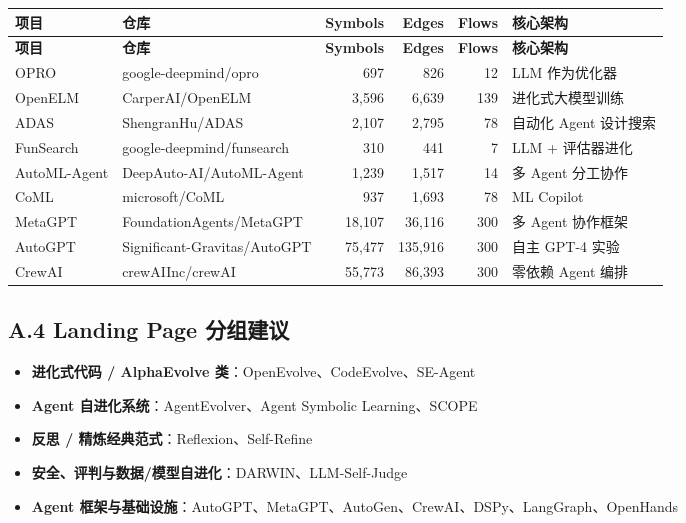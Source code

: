 \begin{longtable}{p{2.2cm}p{3.5cm}rrrp{2cm}}
\toprule
\textbf{项目} & \textbf{仓库} & \textbf{Symbols} & \textbf{Edges} & \textbf{Flows} & \textbf{核心架构} \\
\midrule
\endfirsthead
\toprule
\textbf{项目} & \textbf{仓库} & \textbf{Symbols} & \textbf{Edges} & \textbf{Flows} & \textbf{核心架构} \\
\midrule
\endhead
\bottomrule
\endlastfoot

OPRO & google-deepmind/opro & 697 & 826 & 12 & LLM 作为优化器 \\
OpenELM & CarperAI/OpenELM & 3,596 & 6,639 & 139 & 进化式大模型训练 \\
ADAS & ShengranHu/ADAS & 2,107 & 2,795 & 78 & 自动化 Agent 设计搜索 \\
FunSearch & google-deepmind/funsearch & 310 & 441 & 7 & LLM + 评估器进化 \\
AutoML-Agent & DeepAuto-AI/AutoML-Agent & 1,239 & 1,517 & 14 & 多 Agent 分工协作 \\
CoML & microsoft/CoML & 937 & 1,693 & 78 & ML Copilot \\
MetaGPT & FoundationAgents/MetaGPT & 18,107 & 36,116 & 300 & 多 Agent 协作框架 \\
AutoGPT & Significant-Gravitas/AutoGPT & 75,477 & 135,916 & 300 & 自主 GPT-4 实验 \\
CrewAI & crewAIInc/crewAI & 55,773 & 86,393 & 300 & 零依赖 Agent 编排 \\
\end{longtable}

\subsection*{A.4 Landing Page 分组建议}

\begin{itemize}
\item \textbf{进化式代码 / AlphaEvolve 类}：OpenEvolve、CodeEvolve、SE-Agent
\item \textbf{Agent 自进化系统}：AgentEvolver、Agent Symbolic Learning、SCOPE
\item \textbf{反思 / 精炼经典范式}：Reflexion、Self-Refine
\item \textbf{安全、评判与数据/模型自进化}：DARWIN、LLM-Self-Judge
\item \textbf{Agent 框架与基础设施}：AutoGPT、MetaGPT、AutoGen、CrewAI、DSPy、LangGraph、OpenHands
\end{itemize}

